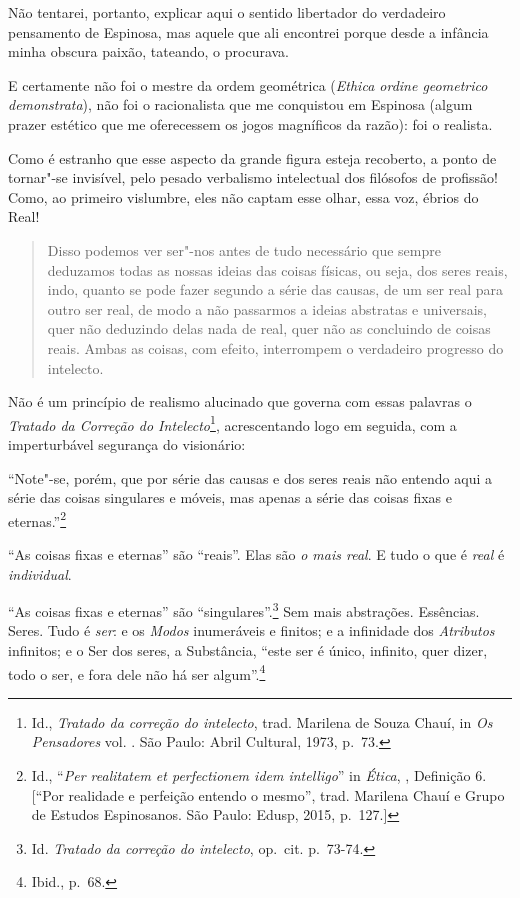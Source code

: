 Não tentarei, portanto, explicar aqui o sentido libertador do verdadeiro
pensamento de Espinosa, mas aquele que ali encontrei porque desde a
infância minha obscura paixão, tateando, o procurava.

E certamente não foi o mestre da ordem geométrica (\emph{Ethica ordine
geometrico demonstrata}), não foi o racionalista que me conquistou em
Espinosa (algum prazer estético que me oferecessem os jogos magníficos
da razão): foi o realista.

Como é estranho que esse aspecto da grande figura esteja recoberto, a
ponto de tornar"-se invisível, pelo pesado verbalismo intelectual dos
filósofos de profissão! Como, ao primeiro vislumbre, eles não captam esse
olhar, essa voz, ébrios do Real!

\begin{quote}
Disso podemos ver ser"-nos antes de tudo necessário que sempre deduzamos
todas as nossas ideias das coisas físicas, ou seja, dos seres reais,
indo, quanto se pode fazer segundo a série das causas, de um ser real
para outro ser real, de modo a não passarmos a ideias abstratas e
universais, quer não deduzindo delas nada de real, quer não as
concluindo de coisas reais. Ambas as coisas, com efeito, interrompem o
verdadeiro progresso do intelecto.
\end{quote}

Não é um princípio de realismo alucinado que governa com essas palavras
o \emph{Tratado da Correção do Intelecto}\footnote{Id., \emph{Tratado da
  correção do intelecto}, trad. Marilena de Souza Chauí, in \emph{Os
    Pensadores} vol. . São Paulo: Abril Cultural, 1973, p.~73.},
acrescentando logo em seguida, com a imperturbável segurança do
visionário:

``Note"-se, porém, que por série das causas e dos seres reais
não entendo aqui a série das coisas singulares e móveis, mas apenas a
série das coisas fixas e eternas.''\footnote{Id., ``\emph{Per realitatem
  et perfectionem idem intelligo}'' in \emph{Ética}, , Definição 6.
  {[}``Por realidade e perfeição entendo o mesmo'', trad. Marilena Chauí
  e Grupo de Estudos Espinosanos. São Paulo: Edusp, 2015, p.~127.{]}}

``As coisas fixas e eternas'' são ``reais''. Elas são \emph{o mais real}. E
tudo o que é \emph{real} é \emph{individual}.

``As coisas fixas e eternas'' são
``singulares''.\footnote{Id. \emph{Tratado da correção do intelecto},
  op.~cit. p.~73-74.} Sem mais abstrações. Essências. Seres. Tudo é \emph{ser}:
e os \emph{Modos} inumeráveis e finitos; e a infinidade dos \emph{Atributos}
infinitos; e o Ser dos seres, a Substância, ``este ser é único,
infinito, quer dizer, todo o ser, e fora dele não há ser
algum''.\footnote{Ibid., p.~68.}

